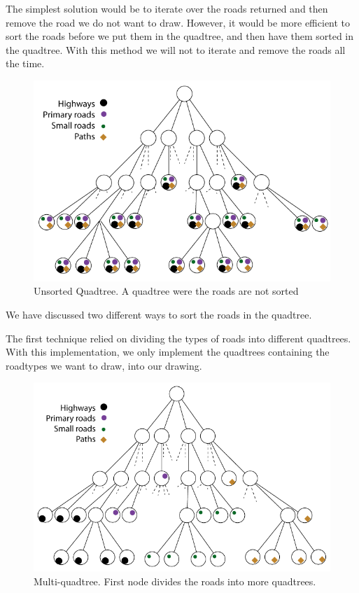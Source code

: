 The simplest solution would be to iterate over the roads returned and then
remove the road we do not want to draw. However, it would be more efficient to sort the 
roads before we put them in the quadtree, and then have them sorted in the quadtree. 
With this method we will not to iterate and remove the roads all the time.

\begin{figure}[h!]
\centering
\includegraphics[width=1\linewidth]{images/UnsortedQuadtree.png}
\caption{Unsorted Quadtree. A quadtree were the roads are not sorted}
\label{IMPL-USQ}
\end{figure}

We have discussed two different ways to sort the roads in the quadtree. 

The first technique relied on dividing the types of roads into different quadtrees.
With this implementation, we only implement the quadtrees containing the roadtypes 
we want to draw, into our drawing.

\begin{figure}[h!]
\centering
\includegraphics[width=1\linewidth]{images/MultiQuadtree.png}
\caption{Multi-quadtree. First node divides the roads into more
quadtrees.}
\label{IMPL-DCQ}
\end{figure}

